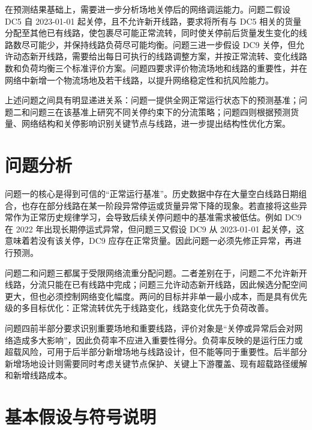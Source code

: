 \documentclass[UTF8,zihao=-4,a4paper,fontset=fandol]{ctexart}
\begin{document}
在预测结果基础上，需要进一步分析场地关停后的网络调运能力。问题二假设 DC5 自 2023-01-01 起关停，且不允许新开线路，要求将所有与 DC5 相关的货量分配至其他已有线路，使包裹尽可能正常流转，同时使关停前后货量发生变化的线路数尽可能少，并保持线路负荷尽可能均衡。问题三进一步假设 DC9 关停，但允许动态新开线路，需要给出每日可执行的线路调整方案，并按正常流转、变化线路数和负荷均衡三个标准评价方案。问题四要求评价物流场地和线路的重要性，并在网络中新增一个物流场地及若干线路，以提升网络稳定性和抗风险能力。



上述问题之间具有明显递进关系：问题一提供全网正常运行状态下的预测基准；问题二和问题三在该基准上研究不同关停约束下的分流策略；问题四则根据预测货量、网络结构和关停影响识别关键节点与线路，进一步提出结构性优化方案。



\section{问题分析}



问题一的核心是得到可信的“正常运行基准”。历史数据中存在大量空白线路日期组合，也存在部分线路在某一阶段异常停运或货量异常下降的现象。若直接将这些异常作为正常历史规律学习，会导致后续关停问题中的基准需求被低估。例如 DC9 在 2022 年出现长期停运式异常，但问题三又假设 DC9 从 2023-01-01 起关停，这意味着若没有该关停，DC9 应存在正常货量。因此问题一必须先修正异常，再进行预测。



问题二和问题三都属于受限网络流重分配问题。二者差别在于，问题二不允许新开线路，分流只能在已有线路中完成；问题三允许动态新开线路，因此候选分配空间更大，但也必须控制网络变化幅度。两问的目标并非单一最小成本，而是具有优先级的多目标优化：正常流转优先于线路变化，线路变化优先于负荷改善。



问题四前半部分要求识别重要场地和重要线路，评价对象是“关停或异常后会对网络造成多大影响”，因此负荷率不应进入重要性得分。负荷率反映的是运行压力或超载风险，可用于后半部分新增场地与线路设计，但不能等同于重要性。后半部分新增场地设计则需要同时考虑关键节点保护、关键上下游覆盖、现有超载路径缓解和新增线路成本。



\section{基本假设与符号说明}
\end{document}
